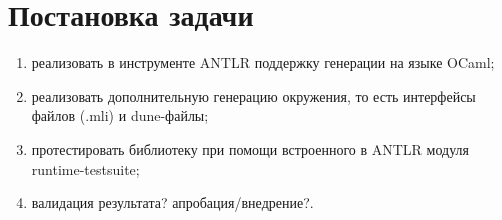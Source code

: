 
\section{Постановка задачи}
\label{sec:task}

\begin{enumerate}
    \item реализовать в инструменте ANTLR поддержку генерации на языке OCaml;
    \item реализовать дополнительную генерацию окружения, то есть интерфейсы файлов (.mli) и dune-файлы;
    \item протестировать библиотеку при помощи встроенного в ANTLR модуля runtime-testsuite;
    \item валидация результата? апробация/внедрение?.
\end{enumerate}
